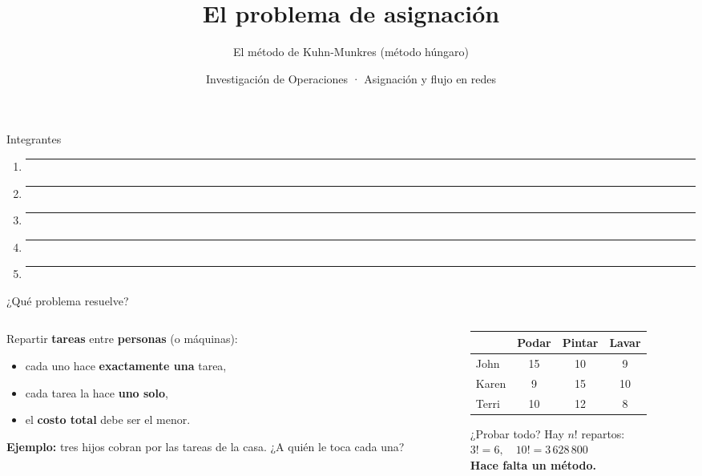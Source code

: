 \documentclass[aspectratio=169]{beamer}
\title{El problema de asignación}
\subtitle{El método de Kuhn-Munkres (método húngaro)}
\author{Investigación de Operaciones · Asignación y flujo en redes}
\date{}
\begin{document}
\begin{frame}
  \titlepage
\end{frame}

\begin{frame}{Integrantes}
  \vspace{1em}
  \begin{enumerate}\setlength{\itemsep}{1.2em}
    \item \rule{0.7\textwidth}{0.4pt}
    \item \rule{0.7\textwidth}{0.4pt}
    \item \rule{0.7\textwidth}{0.4pt}
    \item \rule{0.7\textwidth}{0.4pt}
    \item \rule{0.7\textwidth}{0.4pt}
  \end{enumerate}
\end{frame}

\begin{frame}{¿Qué problema resuelve?}
  \begin{columns}[T]
    \begin{column}{0.5\textwidth}
      Repartir \textbf{tareas} entre \textbf{personas} (o máquinas):
      \begin{itemize}
        \item cada uno hace \textbf{exactamente una} tarea,
        \item cada tarea la hace \textbf{uno solo},
        \item el \textbf{costo total} debe ser el menor.
      \end{itemize}
      \medskip
      \textbf{Ejemplo:} tres hijos cobran por las tareas de la casa. ¿A quién le toca cada una?
    \end{column}
    \begin{column}{0.46\textwidth}
      \centering
      \begin{tabular}{lccc}
        \toprule
        & Podar & Pintar & Lavar \\
        \midrule
        John  & 15 & 10 & 9 \\
        Karen & 9  & 15 & 10 \\
        Terri & 10 & 12 & 8 \\
        \bottomrule
      \end{tabular}

      \bigskip
      ¿Probar todo? Hay $n!$ repartos:\\[2pt]
      $3! = 6, \quad 10! = 3\,628\,800$\\[2pt]
      \textbf{Hace falta un método.}
    \end{column}
  \end{columns}
\end{frame}
\end{document}
